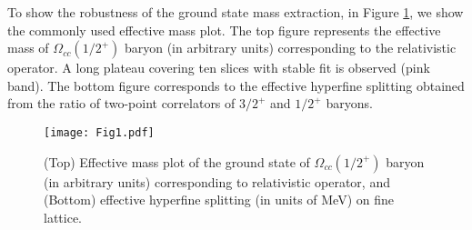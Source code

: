 \documentclass[showkeys,aps,twocolumn,showpacs,preprintnumbers,amsmath,amssymb,prl,letterpaper,floatfix,nofootinbib,superscriptaddress,]{revtex4-1}
\newcommand\bef{\begin{figure}}
\newcommand\eef[1]{\label{fg:#1}\end{figure}}
\newcommand\fgn[1]{Figure \ref{fg:#1}}
\begin{document}
{{To show the robustness of the ground state mass extraction, in \fgn{fig_eff_mass}, we show the commonly used
effective mass plot.
The top figure
represents the effective mass of $\Omega_{cc}(1/2^{+})$ baryon (in
arbitrary units) corresponding to the relativistic operator. A long plateau
covering ten slices with stable fit is observed (pink band). The bottom
figure corresponds to the effective hyperfine splitting obtained from
the ratio of two-point correlators of $3/2^{+}$ and $1/2^{+}$ baryons.
\bef[tbh]
\centering
\texttt{[image: Fig1.pdf]}
\vspace*{-0.09in}
\caption{(Top) Effective mass plot of the ground state of $\Omega_{cc}(1/2^{+})$ baryon (in arbitrary units) corresponding to relativistic operator, and (Bottom) effective hyperfine splitting (in units of MeV) on fine lattice.}
\eef{fig_eff_mass}

}}
\end{document}
